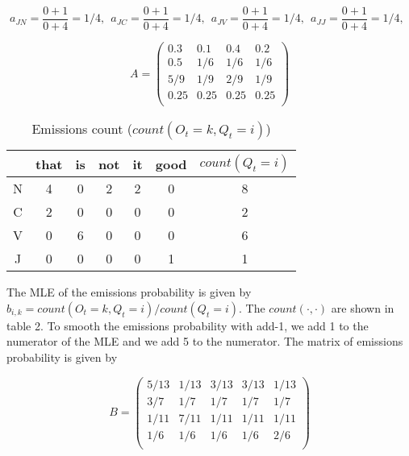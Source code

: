 \documentclass[10pt]{article}
\begin{document}
\[
	a_{JN} = \frac{0+1}{0+4}=1/4,~~
	a_{JC} = \frac{0+1}{0+4}=1/4,~~
	a_{JV} = \frac{0+1}{0+4}=1/4,~~
	a_{JJ} = \frac{0+1}{0+4}=1/4,~~
\]


\[
	A = 
	\begin{pmatrix}
		0.3 & 0.1 & 0.4 & 0.2 \\
		0.5 & 1/6 & 1/6 & 1/6 \\
		5/9 & 1/9 & 2/9 & 1/9 \\
		0.25 & 0.25 & 0.25 & 0.25 \\	
	\end{pmatrix}
\]

\begin{table}[h!]
	\centering
	\begin{tabular}{ c|c|c|c|c|c|c }
		& that & is & not &	it & good & $count(Q_t=i)$ \\
		\hline
		N & 4 & 0 & 2 & 2 & 0 & 8 \\
		\hline
		C & 2 & 0 & 0 & 0 & 0 & 2 \\
		\hline
		V & 0 & 6 & 0 & 0 & 0 & 6 \\
		\hline
		J & 0 & 0 & 0 & 0 & 1 & 1 \\
		\hline
	\end{tabular}
	\caption{Emissions count ($count(O_t=k, Q_t=i)$)}
	\label{table:result}
\end{table}

The MLE of the emissions probability is given by $b_{i,k}=count(O_t=k, Q_t=i)/count(Q_t=i)$. The $count(\cdot, \cdot)$ are shown in table 2. To smooth the emissions probability with add-1, we add 1 to the numerator of the MLE and we add 5 to the numerator. The matrix of emissions probability is given by

\[
	B = 
	\begin{pmatrix}
		5/13 & 1/13 & 3/13 & 3/13 & 1/13\\
		3/7 & 1/7 & 1/7 & 1/7 & 1/7 \\
		1/11 & 7/11 & 1/11 & 1/11 & 1/11\\
		1/6 & 1/6 & 1/6 & 1/6 & 2/6 \\
	\end{pmatrix}
\]
\end{document}
